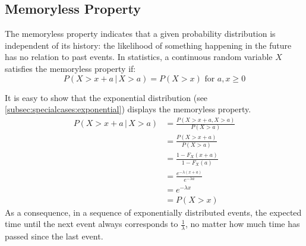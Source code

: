\documentclass[12pt]{article}
\begin{document}

\pagebreak
\subsection{Memoryless Property}
The memoryless property indicates that a given probability distribution is independent of its history: the likelihood of
something happening in the future has no relation to past events. In statistics, a continuous random variable $X$
satisfies the memoryless property if:
 \begin{equation}
	P(X>x+a\, |\, X>a) = P(X>x)\text{ for }a, x \geq 0
 \end{equation}

 It is easy to show that the exponential distribution (see \autoref{subsec:specialcases:exponential}) displays the
 memoryless property.
 \begin{equation}
	 \begin{split}
		 P(X>x+a \, |\, X>a)	&=	\frac{P(X>x+a, X>a)}{P(X>a)}\\
		 						&=	\frac{P(X>x+a)}{P(X>a)}\\
								&=	\frac{1-F_X(x+a)}{1-F_X(a)}\\
								&=	\frac{e^{-\lambda(x+a)}}{e^{-\lambda a}}\\
								&=	e^{-\lambda x}\\
								&=	P(X>x)
	 \end{split}
 \end{equation}
As a consequence, in a sequence of exponentially distributed events, the expected time until the next event always
corresponds to $\frac{1}{\lambda}$, no matter how much time has passed since the last event.
\end{document}
